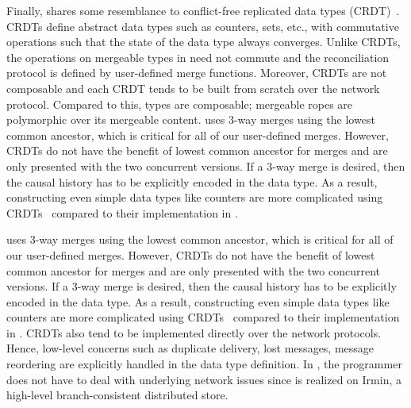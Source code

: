 Finally, \name shares some resemblance to conflict-free replicated
data types (CRDT)~\cite{crdt}. CRDTs define abstract data types such
as counters, sets, etc., with commutative operations such that the
state of the data type always converges. Unlike CRDTs, the operations
on mergeable types in \name need not commute and the reconciliation
protocol is defined by user-defined merge functions. Moreover, CRDTs
are not composable and each CRDT tends to be built from scratch over
the network protocol. Compared to this, \name types are composable;
mergeable ropes are polymorphic over its mergeable content. \name uses
3-way merges using the lowest common ancestor, which is critical for
all of our user-defined merges. However, CRDTs do not have the benefit
of lowest common ancestor for merges and are only presented with the
two concurrent versions. If a 3-way merge is desired, then the causal
history has to be explicitly encoded in the data type. As a result,
constructing even simple data types like counters are more complicated
using CRDTs~\cite{crdt} compared to their implementation in \name.

\name uses 3-way merges using the lowest common ancestor, which is critical for
all of our user-defined merges. However, CRDTs do not have the benefit of
lowest common ancestor for merges and are only presented with the two
concurrent versions. If a 3-way merge is desired, then the causal history has
to be explicitly encoded in the data type. As a result, constructing even
simple data types like counters are more complicated using CRDTs~\cite{crdt}
compared to their implementation in \name. CRDTs also tend to be implemented
directly over the network protocols. Hence, low-level concerns such as
duplicate delivery, lost messages, message reordering are explicitly handled in
the data type definition. In \name, the programmer does not have to deal with
underlying network issues since \name is realized on Irmin, a high-level
branch-consistent distributed store.

